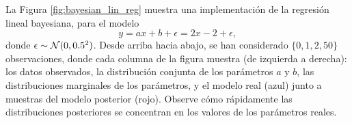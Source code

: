 \begin{mdframed}[style=ejemplo, frametitle={\center Ejemplo: Distribución posterior modelo lineal y gaussiano}]
\noindent
\begin{minipage}[t]{0.32\textwidth}
\vspace{2em}
La Figura \ref{fig:bayesian_lin_reg}  muestra una implementación de la regresión lineal bayesiana, para el modelo 
\begin{equation*}
	y = ax + b + \epsilon= 2x-2	+ \epsilon,
\end{equation*}
donde $\epsilon\sim{\mathcal N}(0,0.5^2)$. Desde arriba hacia abajo, se han considerado $\{0,1,2,50\}$ observaciones, donde  cada columna de la figura muestra (de izquierda a derecha): los datos observados, la distribución conjunta de los parámetros $a$ y $b$, las distribuciones marginales de los parámetros, y el modelo real (azul) junto a muestras del modelo posterior (rojo). Observe cómo rápidamente las distribuciones posteriores se concentran en los valores de los parámetros reales. 
\end{minipage}\hfill
\begin{minipage}[t]{0.65\textwidth}


\end{minipage}
\end{mdframed}
